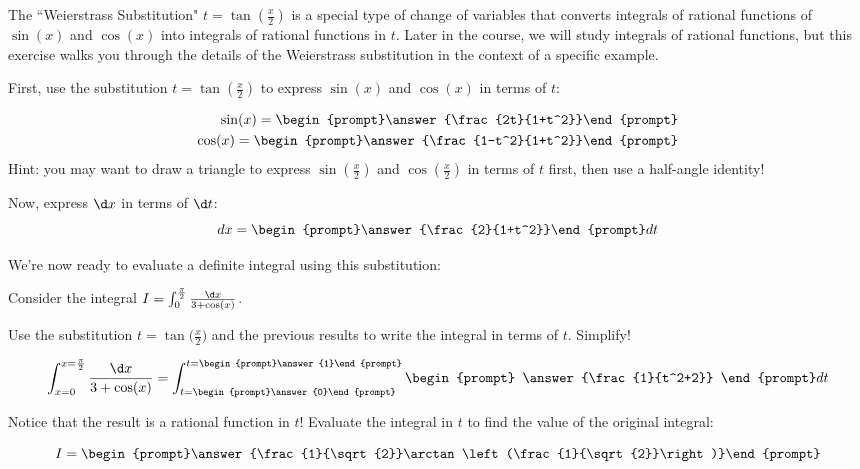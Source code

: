 \documentclass{ximera}
\author{Jim Talamo}
\begin{document}
The ``Weierstrass Substitution" $t= \tan\left(\frac{x}{2}\right)$ is a special type of change of variables that converts integrals of rational functions of $\sin(x)$ and $\cos(x)$ into integrals of rational functions in $t$.  Later in the course, we will study integrals of rational functions, but this exercise walks you through the details of the Weierstrass substitution in the context of a specific example.

\begin{exercise}

First, use the substitution $t= \tan\left(\frac{x}{2}\right)$ to express $\sin(x)$ and $\cos(x)$ in terms of $t$:

\begin{align*}
\sin(x) = \begin{prompt}\answer{\frac{2t}{1+t^2}}\end{prompt}\\
\cos(x) = \begin{prompt}\answer{\frac{1-t^2}{1+t^2}}\end{prompt}
\end{align*}
Hint: you may want to draw a triangle to express $\sin\left(\frac{x}{2}\right)$ and $\cos\left(\frac{x}{2}\right)$ in terms of $t$ first, then use a half-angle identity!

Now, express $\d x$ in terms of $\d t$:
\[dx = \begin{prompt}\answer{\frac{2}{1+t^2}}\end{prompt} dt \]
\end{exercise}

We're now ready to evaluate a definite integral using this substitution:
\begin{exercise}
Consider the integral $I = \int_0^{\frac{\pi}{2}} \frac{\d x}{3+\cos(x)}$.  

Use the substitution $t= \tan\bigg(\frac{x}{2}\bigg)$ and the previous results to write the integral in terms of $t$.  Simplify!

\[ \int_{x=0}^{x= \frac{\pi}{2}} \frac{\d x}{3+\cos(x)}  = \int_{t=\begin{prompt}\answer{0}\end{prompt}}^{t=\begin{prompt}\answer{1}\end{prompt}} \begin{prompt} \answer{\frac{1}{t^2+2}} \end{prompt} dt \]

Notice that the result is a rational function in $t$!  Evaluate the integral in $t$ to find the value of the original integral:

\[ I = \begin{prompt}\answer{\frac{1}{\sqrt{2}}\arctan\left(\frac{1}{\sqrt{2}}\right)}\end{prompt} \]
\end{exercise}
\end{document}
